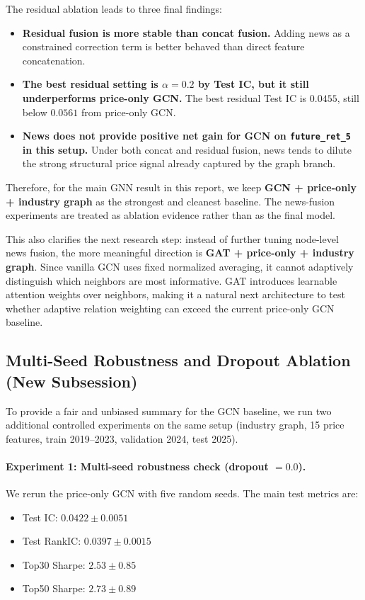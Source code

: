 The residual ablation leads to three final findings:
\begin{itemize}
\item \textbf{Residual fusion is more stable than concat fusion.} Adding news as a constrained correction term is better behaved than direct feature concatenation.
\item \textbf{The best residual setting is $\alpha=0.2$ by Test IC, but it still underperforms price-only GCN.} The best residual Test IC is $0.0455$, still below $0.0561$ from price-only GCN.
\item \textbf{News does not provide positive net gain for GCN on \texttt{future\_ret\_5} in this setup.} Under both concat and residual fusion, news tends to dilute the strong structural price signal already captured by the graph branch.
\end{itemize}

Therefore, for the main GNN result in this report, we keep \textbf{GCN + price-only + industry graph} as the strongest and cleanest baseline. The news-fusion experiments are treated as ablation evidence rather than as the final model.

This also clarifies the next research step: instead of further tuning node-level news fusion, the more meaningful direction is \textbf{GAT + price-only + industry graph}. Since vanilla GCN uses fixed normalized averaging, it cannot adaptively distinguish which neighbors are most informative. GAT introduces learnable attention weights over neighbors, making it a natural next architecture to test whether adaptive relation weighting can exceed the current price-only GCN baseline.

\subsection{Multi-Seed Robustness and Dropout Ablation (New Subsession)}

To provide a fair and unbiased summary for the GCN baseline, we run two additional controlled experiments on the same setup (industry graph, 15 price features, train 2019--2023, validation 2024, test 2025).

\paragraph{Experiment 1: Multi-seed robustness check (dropout $=0.0$).}
We rerun the price-only GCN with five random seeds. The main test metrics are:
\begin{itemize}
\item Test IC: $0.0422 \pm 0.0051$
\item Test RankIC: $0.0397 \pm 0.0015$
\item Top30 Sharpe: $2.53 \pm 0.85$
\item Top50 Sharpe: $2.73 \pm 0.89$
\end{itemize}

